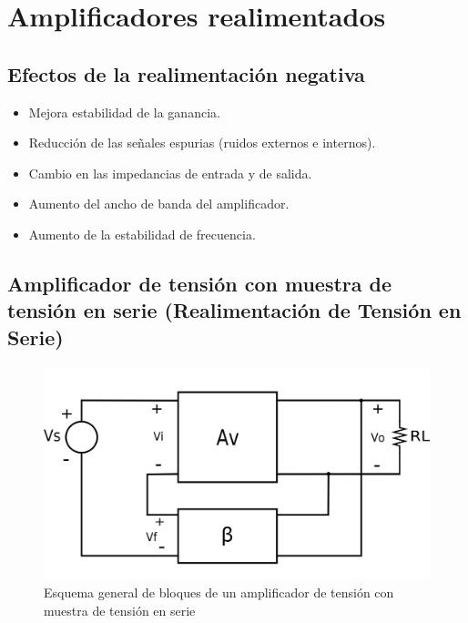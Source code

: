 






\chapter{Amplificadores realimentados}
\section{Efectos de la realimentación negativa}
\begin{itemize}
	\item Mejora estabilidad de la ganancia. 
	\item Reducción de las señales espurias (ruidos externos e internos).
	\item Cambio en las impedancias de entrada y de salida.
	\item Aumento del ancho de banda del amplificador.
	\item Aumento de la estabilidad de frecuencia.
\end{itemize}

\section{Amplificador de tensión con muestra de tensión en serie (Realimentación de Tensión en Serie)}

\begin{figure}[h]
	\includegraphics[width=0.8\linewidth]{./img/1.png}
	\centering
	\caption{Esquema general de bloques de un amplificador de tensión con muestra de tensión en serie}
	\label{fig:amp1}
\end{figure}

